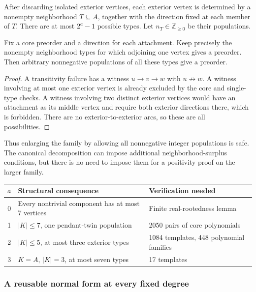 \documentclass[11pt]{article}
\numberwithin{equation}{section}
\theoremstyle{definition}\newtheorem{definition}[theorem]{Definition}\newtheorem{remark}[theorem]{Remark}
\newcommand{\N}{\mathbb Z_{\ge0}}          %
\begin{document}
After discarding isolated exterior vertices, each exterior vertex is determined by a nonempty neighborhood $T\subseteq A$, together with the direction fixed at each member of $T$. There are at most $2^a-1$ possible types. Let $n_T\in\N$ be their populations.

\begin{lemma}\label{pgr:u:d3:lem:compatibility}
Fix a core preorder and a direction for each attachment. Keep precisely the nonempty neighborhood types for which adjoining one vertex gives a preorder. Then arbitrary nonnegative populations of all these types give a preorder.
\end{lemma}
\begin{proof}
A transitivity failure has a witness $u\to v\to w$ with $u\not\to w$. A witness involving at most one exterior vertex is already excluded by the core and single-type checks. A witness involving two distinct exterior vertices would have an attachment as its middle vertex and require both exterior directions there, which is forbidden. There are no exterior-to-exterior arcs, so these are all possibilities.
\end{proof}

Thus enlarging the family by allowing all nonnegative integer populations is safe. The canonical decomposition can impose additional neighborhood-surplus conditions, but there is no need to impose them for a positivity proof on the larger family.

\begin{center}
\small\begin{tabular}{cll}
\toprule
$a$ & Structural consequence & Verification needed\\
\midrule
0 & Every nontrivial component has at most 7 vertices & Finite real-rootedness lemma\\
1 & $|K|\le7$, one pendant-twin population & 2050 pairs of core polynomials\\
2 & $|K|\le5$, at most three exterior types & 1084 templates, 448 polynomial families\\
3 & $K=A$, $|K|=3$, at most seven types & 17 templates\\
\bottomrule
\end{tabular}
\end{center}

\subsubsection{A reusable normal form at every fixed degree}
\end{document}
